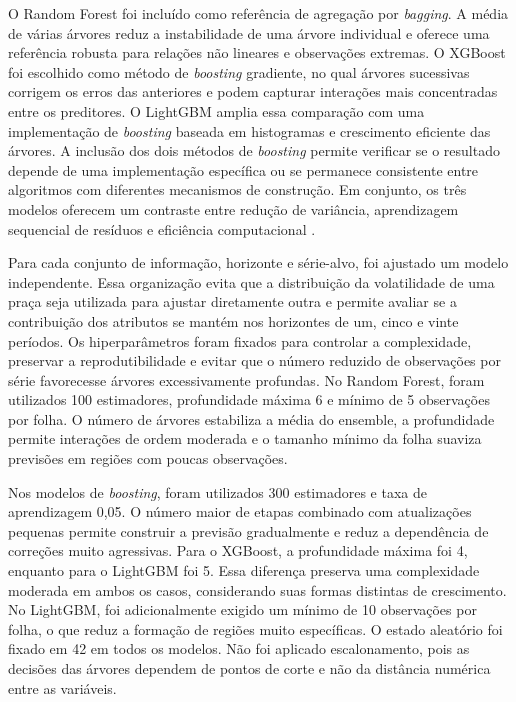 \documentclass[a4paper,fleqn]{cas-sc}
\begin{document}
O Random Forest foi incluído como referência de agregação por \textit{bagging}. A média de várias árvores reduz a instabilidade de uma árvore individual e oferece uma referência robusta para relações não lineares e observações extremas. O XGBoost foi escolhido como método de \textit{boosting} gradiente, no qual árvores sucessivas corrigem os erros das anteriores e podem capturar interações mais concentradas entre os preditores. O LightGBM amplia essa comparação com uma implementação de \textit{boosting} baseada em histogramas e crescimento eficiente das árvores. A inclusão dos dois métodos de \textit{boosting} permite verificar se o resultado depende de uma implementação específica ou se permanece consistente entre algoritmos com diferentes mecanismos de construção. Em conjunto, os três modelos oferecem um contraste entre redução de variância, aprendizagem sequencial de resíduos e eficiência computacional \citep{Breiman2001RandomForest,ChenGuestrin2016XGBoost,Ke2017LightGBM}.

Para cada conjunto de informação, horizonte e série-alvo, foi ajustado um modelo independente. Essa organização evita que a distribuição da volatilidade de uma praça seja utilizada para ajustar diretamente outra e permite avaliar se a contribuição dos atributos se mantém nos horizontes de um, cinco e vinte períodos. Os hiperparâmetros foram fixados para controlar a complexidade, preservar a reprodutibilidade e evitar que o número reduzido de observações por série favorecesse árvores excessivamente profundas. No Random Forest, foram utilizados 100 estimadores, profundidade máxima 6 e mínimo de 5 observações por folha. O número de árvores estabiliza a média do ensemble, a profundidade permite interações de ordem moderada e o tamanho mínimo da folha suaviza previsões em regiões com poucas observações.

Nos modelos de \textit{boosting}, foram utilizados 300 estimadores e taxa de aprendizagem 0,05. O número maior de etapas combinado com atualizações pequenas permite construir a previsão gradualmente e reduz a dependência de correções muito agressivas. Para o XGBoost, a profundidade máxima foi 4, enquanto para o LightGBM foi 5. Essa diferença preserva uma complexidade moderada em ambos os casos, considerando suas formas distintas de crescimento. No LightGBM, foi adicionalmente exigido um mínimo de 10 observações por folha, o que reduz a formação de regiões muito específicas. O estado aleatório foi fixado em 42 em todos os modelos. Não foi aplicado escalonamento, pois as decisões das árvores dependem de pontos de corte e não da distância numérica entre as variáveis.
\end{document}

